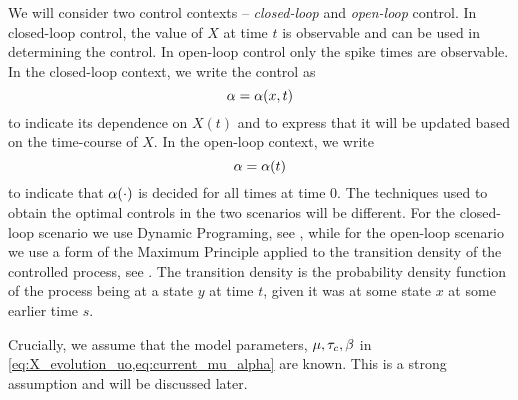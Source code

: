 We will consider two control contexts -- {\sl closed-loop} and  {\sl open-loop}
control. In closed-loop control, the value of $X$ at time $t$ is observable and
can be used in determining the control. In open-loop control only the spike
times are observable. In the closed-loop context, we write the control as $$\alpha =
\alpha(x,t)$$ to indicate its dependence on $X(t)$ and to express that it will be
updated based on the time-course of $X$. In the open-loop context, we write $$\alpha
= \alpha(t)$$ to indicate that $\alpha(\cdot)$ is decided for all times at time 0. The
techniques used to obtain the optimal controls in the two scenarios will be
different. For the closed-loop scenario we use Dynamic Programing, see
\cite{Fleming1975}, while for the open-loop scenario we use a form of the
Maximum Principle applied to the transition density of the controlled process,
see \cite{Borzi2012}. The transition density is the probability density function
of the process being at a state $y$ at time $t$, given it was at some state $x$
at some earlier time $s$.

Crucially, we assume that the model parameters, ${\mu },\tau_c,\beta$ in
\cref{eq:X_evolution_uo,eq:current_mu_alpha} are known. This is a strong assumption and will be
discussed later. 

